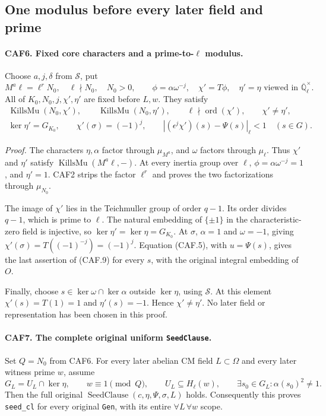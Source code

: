 \documentclass[11pt,a4paper]{article}
\numberwithin{equation}{section}
\theoremstyle{remark}\newtheorem{remark}[theorem]{Remark}
\begin{document}
\subsection{One modulus before every later field and prime}

\paragraph{CAF6. Fixed core characters and a prime-to-\(\ell\) modulus.}
\label{claim:CAF6}
Choose \(a,j,\delta\) from \(\mathcal S\), put
\[
 M^a\ell=\ell^rN_0,\quad \ell\nmid N_0,\quad N_0>0,
 \qquad \phi=\alpha\omega^{-j},\quad
 \chi'=T\phi,\quad \eta'=\eta\text{ viewed in }
                  \overline{\mathbb Q}_\ell^\times.
 \tag{CAF.8}
\]
All of \(K_0,N_0,j,\chi',\eta'\) are fixed before \(L,w\).
They satisfy
\[
 \begin{gathered}
 \operatorname{KillsMu}(N_0,\chi'),\qquad
 \operatorname{KillsMu}(N_0,\eta'),\qquad
 \ell\nmid\operatorname{ord}(\chi'),\qquad \chi'\ne\eta',\\
 \ker\eta'=G_{K_0},\qquad \chi'(\sigma)=(-1)^j,\qquad
 |(\epsilon^j\chi')(s)-\Psi(s)|_\ell<1\quad(s\in G).
 \end{gathered}
 \tag{CAF.9}
\]

\emph{Proof.}
The characters \(\eta,\alpha\) factor through \(\mu_{M^a}\),
and \(\omega\) factors through \(\mu_\ell\).  Thus \(\chi'\)
and \(\eta'\) satisfy \(\operatorname{KillsMu}(M^a\ell,-)\).
At every inertia group over \(\ell\),
\(\phi=\alpha\omega^{-j}=1\), and \(\eta'=1\).
CAF2 strips the factor \(\ell^r\) and proves the two factorizations
through \(\mu_{N_0}\).

The image of \(\chi'\) lies in the Teichmuller group of order
\(q-1\).  Its order divides \(q-1\), which is prime to \(\ell\).
The natural embedding of \(\{\pm1\}\) in the characteristic-zero
field is injective, so \(\ker\eta'=\ker\eta=G_{K_0}\).
At \(\sigma\), \(\alpha=1\) and \(\omega=-1\), giving
\(\chi'(\sigma)=T((-1)^{-j})=(-1)^j\).  Equation (CAF.5), with
\(u=\Psi(s)\), gives the last assertion of (CAF.9) for every
\(s\), with the original integral embedding of \(O\).

Finally, choose \(s\in\ker\omega\cap\ker\alpha\) outside
\(\ker\eta\), using \(\mathcal S\).  At this element
\(\chi'(s)=T(1)=1\) and \(\eta'(s)=-1\).  Hence
\(\chi'\ne\eta'\).  No later field or representation has been
chosen in this proof.

\paragraph{CAF7. The complete original uniform \texttt{Seed\allowbreak Clause}.}
\label{claim:CAF7}
Set \(Q=N_0\) from CAF6.  For every later abelian CM field
\(L\subset\Omega\) and every later witness prime \(w\), assume
\[
 G_L=U_L\cap\ker\eta,\qquad w\equiv1\pmod Q,
 \qquad U_L\subseteq H_\ell(w),\qquad
 \exists s_0\in G_L:\alpha(s_0)^2\ne1.
 \tag{CAF.10}
\]
Then the full original
\(\operatorname{SeedClause}(c,\eta,\Psi,\sigma,L)\) holds.
Consequently this proves \texttt{seed\_\allowbreak cl} for every original
\texttt{Gen}, with its entire \(\forall L\,\forall w\) scope.
\end{document}
